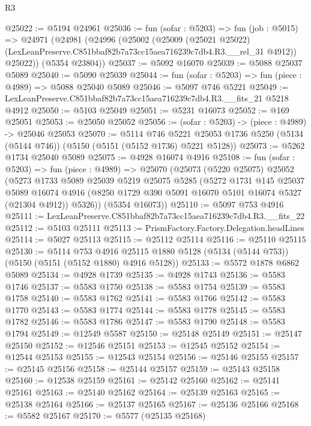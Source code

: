 \begin{lexlean}{R3}
\begin{coremodule}
@25022 := @5194 @24961
@25036 := fun (sofar : @5203) =>
  fun (job : @5015) =>
  @24971
    (@24981
      (@24996
        (@25002
          (@25009
            (@25021 @25022)
            (LexLeanPreserve.C851bbaf82b7a73cc15aea716239c7db4.R3.__rel_31 @4912))
          @25022))
      (@5354 @23804))
@25037 := @5092 @16070
@25039 := @5088 @25037 @5089
@25040 := @5090 @25039
@25044 := fun (sofar : @5203) => fun (piece : @4989) => @5088 @25040 @5089
@25046 := @5097 @746 @5221
@25049 := LexLeanPreserve.C851bbaf82b7a73cc15aea716239c7db4.R3.__fits_21 @5218 @4912
@25050 := @5103 @25049
@25051 := @5231 @16073
@25052 := @169 @25051
@25053 := @25050 @25052
@25056 := (sofar : @5203) -> (piece : @4989) -> @25046 @25053
@25070 := @5114
    @746
    @5221
    @25053
    @1736
    @5250
    (@5134 (@5144 @746))
    (@5150 (@5151 (@5152 @1736) @5221 @5128))
@25073 := @5262 @1734 @25040 @5089
@25075 := @4928 @16074 @4916
@25108 := fun (sofar : @5203) =>
  fun (piece : @4989) =>
  @25070
    (@25073
      (@5220 @25075)
      @25052
      (@5273
        @1733
        @5089
        @25039
        @5219
        @25075
        @5285
        (@5272
          @1731
          @145
          @25037
          @5089
          @16074
          @4916
          (@8250 @1729 @390 @5091 @16070 @5101 @16074 @5327 (@21304 @4912))
          @5326))
      (@5354 @16073))
@25110 := @5097 @753 @4916
@25111 := LexLeanPreserve.C851bbaf82b7a73cc15aea716239c7db4.R3.__fits_22
@25112 := @5103 @25111
@25113 := PrismFactory.Factory.Delegation.headLines
@25114 := @5027 @25113
@25115 := @25112 @25114
@25116 := @25110 @25115
@25130 := @5114
    @753
    @4916
    @25115
    @1880
    @5128
    (@5134 (@5144 @753))
    (@5150 (@5151 (@5152 @1880) @4916 @5128))
@25133 := @5572 @1878 @6862 @5089
@25134 := @4928 @1739
@25135 := @4928 @1743
@25136 := @5583 @1746
@25137 := @5583 @1750
@25138 := @5583 @1754
@25139 := @5583 @1758
@25140 := @5583 @1762
@25141 := @5583 @1766
@25142 := @5583 @1770
@25143 := @5583 @1774
@25144 := @5583 @1778
@25145 := @5583 @1782
@25146 := @5583 @1786
@25147 := @5583 @1790
@25148 := @5583 @1794
@25149 := @12549 @5587
@25150 := @25148 @25149
@25151 := @25147 @25150
@25152 := @12546 @25151
@25153 := @12545 @25152
@25154 := @12544 @25153
@25155 := @12543 @25154
@25156 := @25146 @25155
@25157 := @25145 @25156
@25158 := @25144 @25157
@25159 := @25143 @25158
@25160 := @12538 @25159
@25161 := @25142 @25160
@25162 := @25141 @25161
@25163 := @25140 @25162
@25164 := @25139 @25163
@25165 := @25138 @25164
@25166 := @25137 @25165
@25167 := @25136 @25166
@25168 := @5582 @25167
@25170 := @5577 (@25135 @25168)

\end{coremodule}
\end{lexlean}
